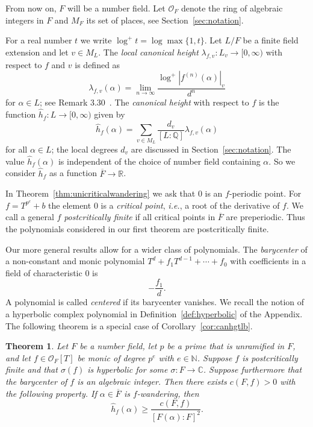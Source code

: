 \documentclass[12pt,oneside,a4]{amsart}
\newcommand{\IC}{\mathbb{C}}
\newcommand{\IN}{\mathbb{N}}
\newcommand{\IQ}{\mathbb{Q}}
\newcommand{\IR}{\mathbb{R}}
\newcommand{\cO}{\mathcal{O}}
\newcounter{maincounter}
\numberwithin{maincounter}{section}
\numberwithin{equation}{section}
\newtheorem{theorem}[maincounter]{Theorem}
\begin{document}
From now on, $F$ will be a number field. Let $\cO_F$ denote the ring
of algebraic integers in $F$ and $M_F$ its set of places, see
Section~\ref{sec:notation}. 




For a real number $t$ we write $\log^+ t =
\log\max\{1,t\}$. Let $L/F$ be a finite field extension and let
$v\in M_L$. The \textit{local canonical height} $\lambda_{f,v} \colon L_v
\rightarrow[0,\infty)$ with respect to $f$ and $v$ is defined as 
\begin{equation}
  \label{def:lambdafv}
  \lambda_{f,v}(\alpha) = \lim_{n\rightarrow\infty} \frac{\log^+ |f^{(n)}(\alpha)|_v}{d^n}
\end{equation}
for $\alpha \in L$; see Remark 3.30~\cite{Silverman:gtm241}. 
The \textit{canonical height} with respect to $f$
 is the function $\hat h_f \colon L\rightarrow[0,\infty)$
given by
\begin{equation}
  \label{def:canonicalhgt}
  \hat h_{f}(\alpha) = \sum_{v\in M_L} \frac{d_v}{[L:\IQ]}
  \lambda_{f,v}(\alpha)
\end{equation}
for all $\alpha\in L$; the local degrees $d_v$ are discussed in
Section~\ref{sec:notation}.
The value $\hat h_{f}(\alpha)$ is independent of the choice of number
field
containing $\alpha$. 
So we consider $\hat h_f$ as a function $\overline
F\rightarrow\IR$. 

In Theorem~\ref{thm:unicriticalwandering} we ask that $0$ is an
$f$-periodic point.
For $f=T^{p^e}+b$ the element $0$ is a
 \textit{critical point}, \textit{i.e.}, a root of the derivative of
 $f$.
We  call a general  $f$ \textit{postcritically finite} if
all critical points in  $\overline F$ are preperiodic.
Thus the polynomials considered in our first theorem are postcritically finite. 

Our more general results allow for a wider class of polynomials. 
The \textit{barycenter} of a non-constant and
monic polynomial $T^d+f_1T^{d-1}+\cdots+f_0$
with coefficients in a field of characteristic $0$ is
\begin{equation}
  \label{def:barycenter}
  -\frac{f_1}{d}.
\end{equation}
A polynomial is called \textit{centered} if its barycenter vanishes.
We recall the notion of a {hyperbolic} complex polynomial in
Definition~\ref{def:hyperbolic} of the Appendix. 
The following theorem is a special case of Corollary~\ref{cor:canhgtlb}.
\begin{theorem}
  \label{thm:mainintro}
  Let $F$ be a number field, let $p$ be a prime that is unramified in
  $F$, and let
  $f\in \cO_F[T]$ be monic of degree
  $p^e$ with $e\in\IN$. Suppose $f$ is postcritically finite and
  that $\sigma(f)$ is hyperbolic for some $\sigma\colon
  F\rightarrow\IC$. Suppose furthermore that the barycenter of $f$
  is an algebraic integer. 
  Then there exists $c(F,f)>0$  with the following property. 
  If $\alpha\in \overline F$  is $f$-wandering, then
  \begin{equation*}
    \hat h_f(\alpha) \ge \frac{c(F,f)}{[F(\alpha):F]^{2}}.  
  \end{equation*}
\end{theorem}
\end{document}
